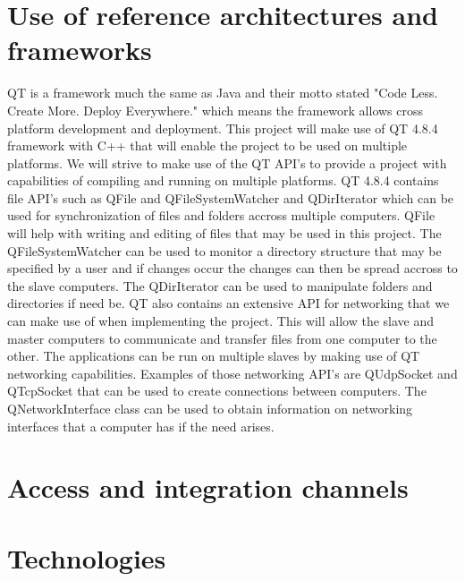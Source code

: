 \documentclass[a4paper,12pt,final]{article}
\begin{document}
\section{Use of reference architectures and\\ frameworks}
QT is a framework much the same as Java and their motto stated "Code Less. Create More. Deploy Everywhere." which means the framework allows cross platform development and deployment. This project will make use of QT 4.8.4 framework with C++ that will enable the project to be used on multiple platforms. We will strive to make use of the QT API's to provide a project with capabilities of compiling and running on multiple platforms.
\vspace{6pt}\newline
QT 4.8.4 contains file API's such as QFile and QFileSystemWatcher and QDirIterator which can be used for synchronization of files and folders accross multiple computers. QFile will help with writing and editing of files that may be used in this project. The QFileSystemWatcher can be used to monitor a directory structure that may be specified by a user and if changes occur the changes can then be spread accross to the slave computers. The QDirIterator can be used to manipulate folders and directories if need be.
\vspace{6pt}\newline
QT also contains an extensive API for networking that we can make use of when implementing the project. This will allow the slave and master computers to communicate and transfer files from one computer to the other. The applications can be run on multiple slaves by making use of QT networking capabilities. Examples of those networking API's are QUdpSocket and QTcpSocket that can be used to create connections between computers. The QNetworkInterface class can be used to obtain information on networking interfaces that a computer has if the need arises.
\section{Access and integration channels}
\section{Technologies}
\end{document}
